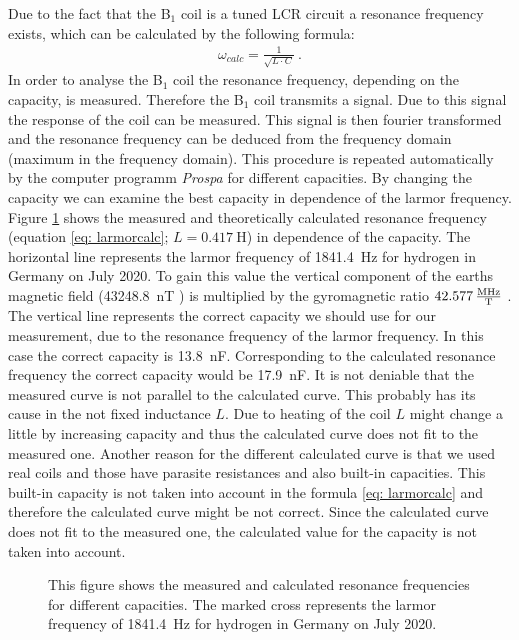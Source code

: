 Due to the fact that the B$_1$ coil is a tuned LCR circuit a resonance frequency exists, which can be calculated by the following formula:
\begin{align}
    \omega_{calc} = \frac{1}{\sqrt{L \cdot C}} \ .
    \label{eq: larmorcalc}
\end{align}
In order to analyse the B$_1$ coil the resonance frequency, depending on the capacity, is measured.
Therefore the B$_1$ coil transmits a signal.
Due to this signal the response of the coil can be measured.
This signal is then fourier transformed and the resonance frequency can be deduced from the frequency domain (maximum in the frequency domain).
This procedure is repeated automatically by the computer programm \textit{Prospa} for different capacities.
By changing the capacity we can examine the best capacity in dependence of the larmor frequency.
Figure \ref{fig: Coilanalyse} shows the measured and theoretically calculated resonance frequency (equation \eqref{eq: larmorcalc}; $L = \SI{0.417}{\henry}$) in dependence of the capacity.
The horizontal line represents the larmor frequency of \SI{1841.4}{\hertz} for hydrogen in Germany on July 2020.
To gain this value the vertical component of the earths magnetic field (\SI{43248.8}{\nano \tesla} \cite{magnetfeld}) is multiplied by the gyromagnetic ratio $\SI{42.577}{\frac{\mega \hertz}{\tesla}}$ \cite{magnetfeld}.
The vertical line represents the correct capacity we should use for our measurement, due to the resonance frequency of the larmor frequency.
In this case the correct capacity is \SI{13.8}{\nano \farad}.
Corresponding to the calculated resonance frequency the correct capacity would be \SI{17.9}{\nano \farad}.
It is not deniable that the measured curve is not parallel to the calculated curve.
This probably has its cause in the not fixed inductance $L$.
Due to heating of the coil $L$ might change a little by increasing capacity and thus the calculated curve does not fit to the measured one.
Another reason for the different calculated curve is that we used real coils and those have parasite resistances and also built-in capacities.
This built-in capacity is not taken into account in the formula \eqref{eq: larmorcalc} and therefore the calculated curve might be not correct.
Since the calculated curve does not fit to the measured one, the calculated value for the capacity is not taken into account.

\begin{figure}[H]
    \centering
    
    \caption[This figure shows the measured and calculated resonance frequencies for different capacities.]{This figure shows the measured and calculated resonance frequencies for different capacities.
    The marked cross represents the larmor frequency of \SI{1841.4}{\hertz} for hydrogen in Germany on July 2020.}
    \label{fig: Coilanalyse}
\end{figure}